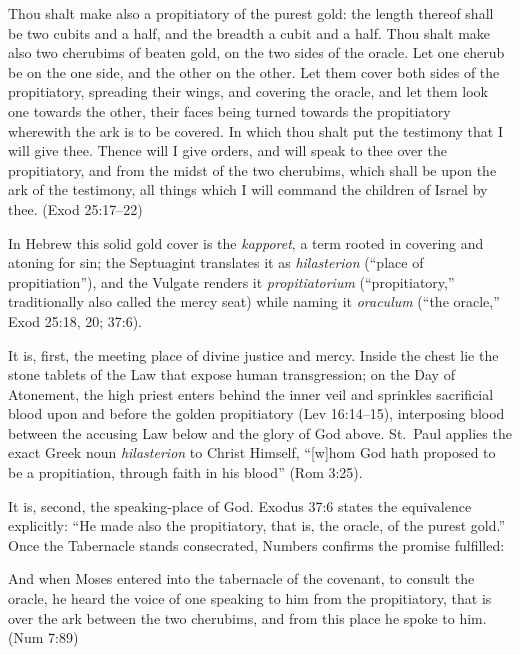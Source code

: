 \begin{scriptureblock}
Thou shalt make also a propitiatory of the purest gold: the length thereof shall be two cubits and a half, and the breadth a cubit and a half. Thou shalt make also two cherubims of beaten gold, on the two sides of the oracle. Let one cherub be on the one side, and the other on the other. Let them cover both sides of the propitiatory, spreading their wings, and covering the oracle, and let them look one towards the other, their faces being turned towards the propitiatory wherewith the ark is to be covered. In which thou shalt put the testimony that I will give thee. Thence will I give orders, and will speak to thee over the propitiatory, and from the midst of the two cherubims, which shall be upon the ark of the testimony, all things which I will command the children of Israel by thee. \textnormal{(Exod 25:17--22)}
\end{scriptureblock}

In Hebrew this solid gold cover is the \textit{kapporet}, a term rooted in covering and atoning for sin; the Septuagint translates it as \textit{hilasterion} (``place of propitiation''), and the Vulgate renders it \textit{propitiatorium} (``propitiatory,'' traditionally also called the mercy seat) while naming it \textit{oraculum} (``the oracle,'' Exod 25:18, 20; 37:6).

It is, first, the meeting place of divine justice and mercy. Inside the chest lie the stone tablets of the Law that expose human transgression; on the Day of Atonement, the high priest enters behind the inner veil and sprinkles sacrificial blood upon and before the golden propitiatory (Lev 16:14--15), interposing blood between the accusing Law below and the glory of God above. St.\ Paul applies the exact Greek noun \textit{hilasterion} to Christ Himself, ``[w]hom God hath proposed to be a propitiation, through faith in his blood'' (Rom 3:25).

It is, second, the speaking-place of God. Exodus 37:6 states the equivalence explicitly: ``He made also the propitiatory, that is, the oracle, of the purest gold.'' Once the Tabernacle stands consecrated, Numbers confirms the promise fulfilled:

\begin{scriptureblock}
And when Moses entered into the tabernacle of the covenant, to consult the oracle, he heard the voice of one speaking to him from the propitiatory, that is over the ark between the two cherubims, and from this place he spoke to him. \textnormal{(Num 7:89)}
\end{scriptureblock}

